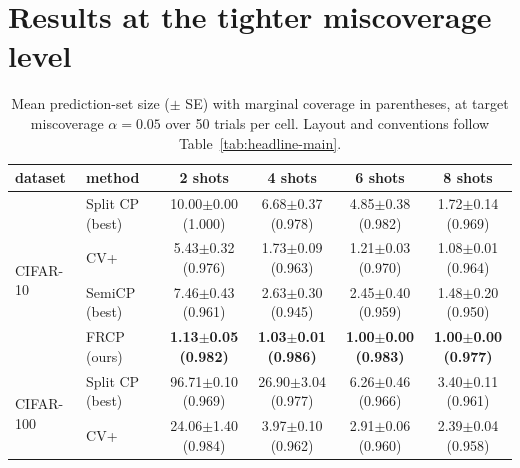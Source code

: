 


\section{Results at the tighter miscoverage level}
\label{app:alpha005}


\begin{table}[h]
\caption{Mean prediction-set size ($\pm$ SE) with marginal coverage in
parentheses, at target miscoverage $\alpha = 0.05$ over 50 trials per
cell. Layout and conventions follow Table~\ref{tab:headline-main}.}
\label{tab:headline-appendix-a005}
\begin{center}
\small
\setlength{\tabcolsep}{4pt}
\begin{tabular}{llcccc}
\toprule
dataset & method & 2 shots & 4 shots & 6 shots & 8 shots\\
\midrule
\multirow{4}{*}{CIFAR-10} & Split CP (best) & 10.00$\pm$0.00 {\scriptsize(1.000)} & 6.68$\pm$0.37 {\scriptsize(0.978)} & 4.85$\pm$0.38 {\scriptsize(0.982)} & 1.72$\pm$0.14 {\scriptsize(0.969)}\\
 & CV+ & 5.43$\pm$0.32 {\scriptsize(0.976)} & 1.73$\pm$0.09 {\scriptsize(0.963)} & 1.21$\pm$0.03 {\scriptsize(0.970)} & 1.08$\pm$0.01 {\scriptsize(0.964)}\\
 & SemiCP (best) & 7.46$\pm$0.43 {\scriptsize(0.961)} & 2.63$\pm$0.30 {\scriptsize(0.945)} & 2.45$\pm$0.40 {\scriptsize(0.959)} & 1.48$\pm$0.20 {\scriptsize(0.950)}\\
 & FRCP (ours) & \textbf{1.13$\pm$0.05 {\scriptsize(0.982)}} & \textbf{1.03$\pm$0.01 {\scriptsize(0.986)}} & \textbf{1.00$\pm$0.00 {\scriptsize(0.983)}} & \textbf{1.00$\pm$0.00 {\scriptsize(0.977)}}\\
\midrule
\multirow{4}{*}{CIFAR-100} & Split CP (best) & 96.71$\pm$0.10 {\scriptsize(0.969)} & 26.90$\pm$3.04 {\scriptsize(0.977)} & 6.26$\pm$0.46 {\scriptsize(0.966)} & 3.40$\pm$0.11 {\scriptsize(0.961)}\\
 & CV+ & 24.06$\pm$1.40 {\scriptsize(0.984)} & 3.97$\pm$0.10 {\scriptsize(0.962)} & 2.91$\pm$0.06 {\scriptsize(0.960)} & 2.39$\pm$0.04 {\scriptsize(0.958)}\\

\end{tabular}
\end{center}
\end{table}
